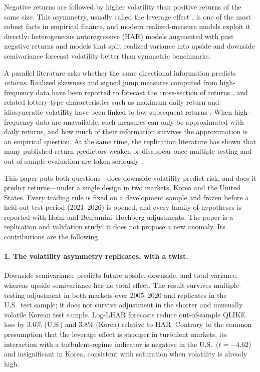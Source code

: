 \documentclass[11pt]{article}
\begin{document}
Negative returns are followed by higher volatility than positive returns of the same size. This asymmetry, usually called the leverage effect \citep{black1976,christie1982}, is one of the most robust facts in empirical finance, and modern realized-measure models exploit it directly: heterogeneous autoregressive (HAR) models augmented with past negative returns \citep{corsi2009,corsireno2012} and models that split realized variance into upside and downside semivariance \citep{bns2010,pattonsheppard2015} forecast volatility better than symmetric benchmarks.

A parallel literature asks whether the same directional information predicts \emph{returns}. Realized skewness and signed jump measures computed from high-frequency data have been reported to forecast the cross-section of returns \citep{amaya2015}, and related lottery-type characteristics such as maximum daily return and idiosyncratic volatility have been linked to low subsequent returns \citep{ang2006,bali2011}. When high-frequency data are unavailable, such measures can only be approximated with daily returns, and how much of their information survives the approximation is an empirical question. At the same time, the replication literature has shown that many published return predictors weaken or disappear once multiple testing and out-of-sample evaluation are taken seriously \citep{hlz2016,hxz2020}.

This paper puts both questions---does downside volatility predict risk, and does it predict returns---under a single design in two markets, Korea and the United States. Every trading rule is fixed on a development sample and frozen before a held-out test period (2021--2026) is opened, and every family of hypotheses is reported with Holm and Benjamini--Hochberg adjustments. The paper is a replication and validation study; it does not propose a new anomaly. Its contributions are the following.

\paragraph{1. The volatility asymmetry replicates, with a twist.} Downside semivariance predicts future upside, downside, and total variance, whereas upside semivariance has no total effect. The result survives multiple-testing adjustment in both markets over 2005--2020 and replicates in the U.S.\ test sample; it does not survive adjustment in the shorter and unusually volatile Korean test sample. Log-LHAR forecasts reduce out-of-sample QLIKE loss by 3.6\% (U.S.) and 3.8\% (Korea) relative to HAR. Contrary to the common presumption that the leverage effect is stronger in turbulent markets, its interaction with a turbulent-regime indicator is negative in the U.S.\ ($t=-4.62$) and insignificant in Korea, consistent with saturation when volatility is already high.
\end{document}
